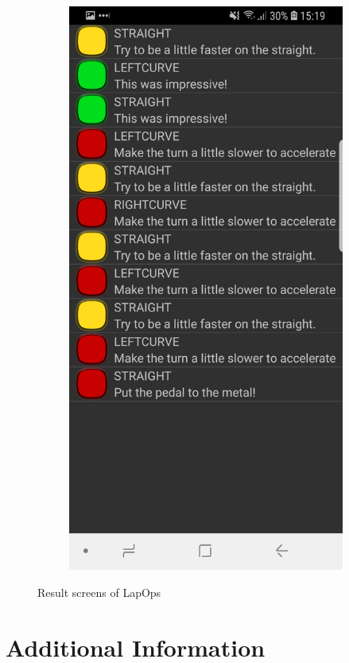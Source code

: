 \begin{figure}[H]
\begin{subfigure}[c]{0.32\textwidth}
	\end{subfigure}
	\hfill
	\begin{subfigure}[c]{0.32\textwidth}
		\includegraphics[width=\textwidth]{Pictures/App/SectionScreen2.jpg}
	\end{subfigure}

	\caption{Result screens of LapOps}
	\label{LapOpsResult}
\end{figure}

\section{Additional Information}

